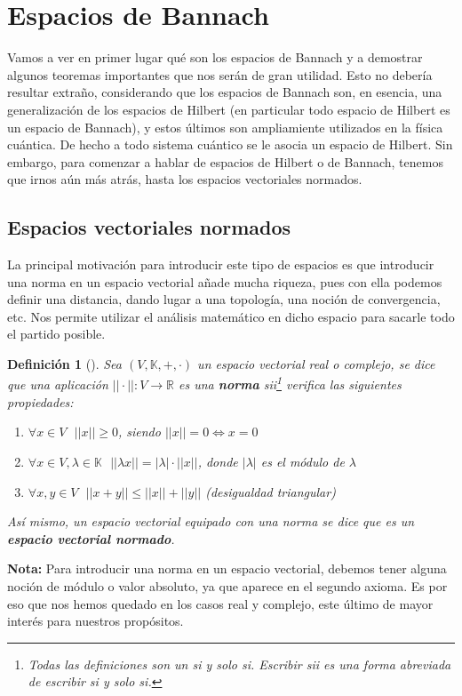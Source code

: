 \documentclass[12pt]{report}
\newtheorem{definition}{Definición}
\newenvironment{dft}[1][]
    {\begin{leftbar}\begin{definition}[#1]}
    {\end{definition}\end{leftbar}}
\begin{document}
\section{Espacios de Bannach}
Vamos a ver en primer lugar qué son los espacios de Bannach y a demostrar algunos teoremas importantes que nos serán de gran utilidad. Esto no debería resultar extraño, considerando que los espacios de Bannach son, en esencia, una generalización de los espacios de Hilbert (en particular todo espacio de Hilbert es un espacio de Bannach), y estos últimos son ampliamiente utilizados en la física cuántica. De hecho a todo sistema cuántico se le asocia un espacio de Hilbert. Sin embargo, para comenzar a hablar de espacios de Hilbert o de Bannach, tenemos que irnos aún más atrás, hasta los espacios vectoriales normados.

\subsection{Espacios vectoriales normados}
La principal motivación para introducir este tipo de espacios es que introducir una norma en un espacio vectorial añade mucha riqueza, pues con ella podemos definir una distancia, dando lugar a una topología, una noción de convergencia, etc. Nos permite utilizar el análisis matemático en dicho espacio para sacarle todo el partido posible.
\begin{dft}
Sea $(V,\mathbb{K},+,\cdot )$ un espacio vectorial real o complejo, se dice que una aplicación $||\cdot ||:V\to\mathbb{R}$ es una \textbf{norma} sii\footnote{Todas las definiciones son un si y solo si. Escribir sii es una forma abreviada de escribir si y solo si.} verifica las siguientes propiedades:
\begin{enumerate}
    \item $\forall x\in V\ \ \ ||x||\geq 0$, siendo $||x||=0\iff x=0$
    \item $\forall x\in V, \lambda\in\mathbb{K}\ \ \ ||\lambda x||=|\lambda |\cdot ||x||$, donde $|\lambda |$ es el módulo de $\lambda$
    \item $\forall x,y\in V\ \ \ ||x+y||\leq ||x||+||y||$ (desigualdad triangular)
\end{enumerate}
Así mismo, un espacio vectorial equipado con una norma se dice que es un \textbf{espacio vectorial normado}.
\end{dft}

\textbf{Nota:} Para introducir una norma en un espacio vectorial, debemos tener alguna noción de módulo o valor absoluto, ya que aparece en el segundo axioma. Es por eso que nos hemos quedado en los casos real y complejo, este último de mayor interés para nuestros propósitos.
\end{document}
